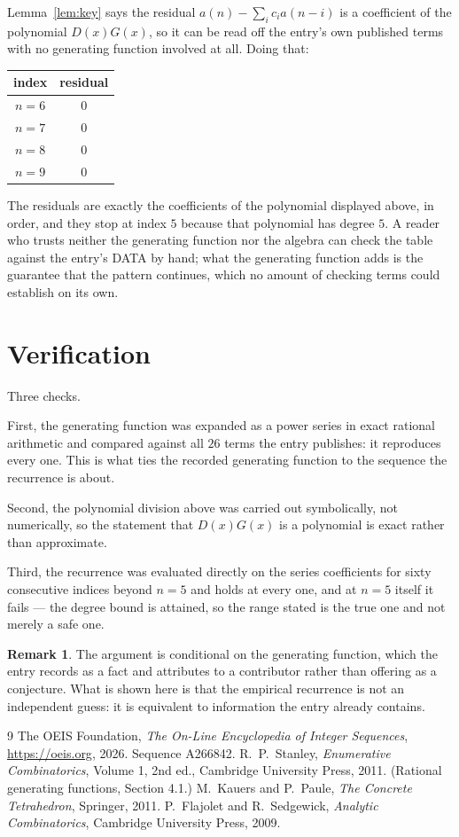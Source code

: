 \documentclass[11pt,a4paper]{article}
\theoremstyle{plain}
\theoremstyle{definition}
\newtheorem{remark}[theorem]{Remark}
\begin{document}
Lemma~\ref{lem:key} says the residual $a(n)-\sum_ic_ia(n-i)$ is a coefficient of the
polynomial $D(x)G(x)$, so it can be read off the entry's own published terms with no
generating function involved at all. Doing that:
\begin{center}
\begin{tabular}{cc}
index & residual \\ \hline
$n=6$ & $0$ \\
$n=7$ & $0$ \\
$n=8$ & $0$ \\
$n=9$ & $0$
\end{tabular}
\end{center}
The residuals are exactly the coefficients of the polynomial displayed above, in order, and
they stop at index $5$ because that polynomial has degree $5$. A reader who trusts
neither the generating function nor the algebra can check the table against the entry's DATA
by hand; what the generating function adds is the guarantee that the pattern continues, which
no amount of checking terms could establish on its own.

\section{Verification}

Three checks.

First, the generating function was expanded as a power series in exact rational arithmetic and
compared against all $26$ terms the entry publishes: it reproduces every one. This is
what ties the recorded generating function to the sequence the recurrence is about.

Second, the polynomial division above was carried out symbolically, not numerically, so the
statement that $D(x)G(x)$ is a polynomial is exact rather than approximate.

Third, the recurrence was evaluated directly on the series coefficients for sixty consecutive
indices beyond $n=5$ and holds at every one, and at $n=5$ itself it fails --- the
degree bound is attained, so the range stated is the true one and not merely a safe one.

\begin{remark}
The argument is conditional on the generating function, which the entry records as a fact and
attributes to a contributor rather than offering as a conjecture. What is shown here is that
the empirical recurrence is not an independent guess: it is equivalent to information the
entry already contains.
\end{remark}

\begin{thebibliography}{9}
 The OEIS Foundation, \emph{The On-Line Encyclopedia of Integer
Sequences}, \url{https://oeis.org}, 2026. Sequence A266842.
 R.~P.~Stanley, \emph{Enumerative Combinatorics}, Volume 1, 2nd ed.,
Cambridge University Press, 2011. (Rational generating functions, Section 4.1.)
 M.~Kauers and P.~Paule, \emph{The Concrete Tetrahedron}, Springer, 2011.
 P.~Flajolet and R.~Sedgewick, \emph{Analytic Combinatorics}, Cambridge
University Press, 2009.
\end{thebibliography}
\end{document}
